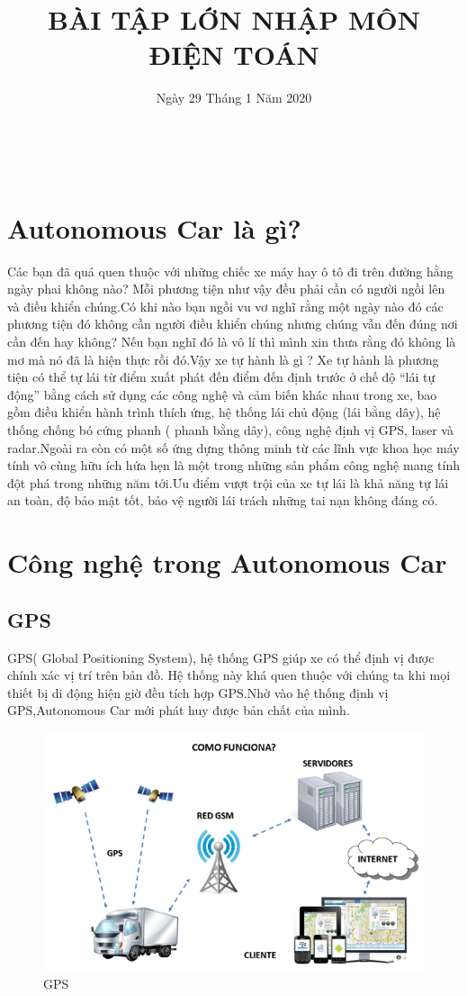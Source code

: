 \documentclass{article}
\title{BÀI TẬP LỚN NHẬP MÔN ĐIỆN TOÁN}
\author{}
\date{Ngày 29 Tháng 1 Năm 2020}
\begin{document}
\maketitle
\tableofcontents\newpage
\
\section{Autonomous Car là gì?}
Các bạn đã quá quen thuộc với những chiếc xe máy hay ô tô đi trên đường hằng ngày phai không nào? Mỗi phương tiện như vậy đều phải cần có người ngồi lên và điều khiển chúng.Có khi nào bạn ngồi vu vơ nghĩ rằng một ngày nào đó các phương tiện đó không cần người điều khiển chúng nhưng chúng vẫn đến đúng nơi cần đến hay không? Nếu bạn nghĩ đó là vô lí thì mình xin thưa rằng đó không là mơ mà nó đã là hiện thực rồi đó.Vậy xe tự hành là gì ? Xe tự hành là phương tiện có thể tự lái từ điểm xuất phát đến điểm đến định trước ở chế độ “lái tự động” bằng cách sử dụng các công nghệ và cảm biến khác nhau trong xe, bao gồm điều khiển hành trình thích ứng, hệ thống lái chủ động (lái bằng dây), hệ thống chống bó cứng phanh ( phanh bằng dây), công nghệ định vị GPS, laser và radar.Ngoài ra còn có một số ứng dựng thông minh từ các lĩnh vực khoa học máy tính vô cùng hữu ích hứa hẹn là một trong những sản phẩm công nghệ mang tính đột phá trong những năm tới.Ưu điểm vượt trội của xe tự lái là khả năng tự lái an toàn, độ bảo mật tốt, bảo vệ người lái trách những tai nạn không đáng có.

\section{Công nghệ trong Autonomous Car}
\subsection{GPS}
GPS( Global Positioning System), hệ thống GPS giúp xe có thể định vị được chính xác vị trí trên bản đồ. Hệ thống này khá quen thuộc với chúng ta khi mọi thiết bị di động hiện giờ đều tích hợp GPS.Nhờ vào hệ thống định vị GPS,Autonomous Car mới phát huy được bản chất của mình.
\begin{figure}[h]
\centering 
\includegraphics[width=150mm]{1.png} 
\caption{GPS} 
\label{dinhnghia} 
\end{figure}
\end{document}
